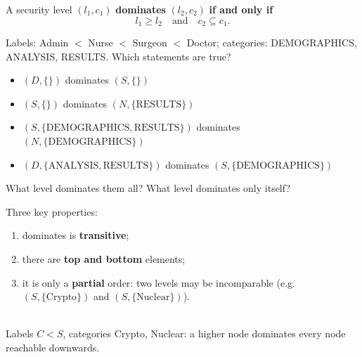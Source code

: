 \begin{defnbox}[title=Dominance relationship]
A security level $(l_1, c_1)$ \textbf{dominates} $(l_2, c_2)$ \textbf{if and only if}
\[
  l_1 \geq l_2 \quad\text{and}\quad c_2 \subseteq c_1 .
\]
\end{defnbox}

\begin{exbox}[title={Exercise --- Dominance}]
Labels: Admin $<$ Nurse $<$ Surgeon $<$ Doctor; categories: DEMOGRAPHICS, ANALYSIS,
RESULTS. Which statements are true?
\begin{itemize}
  \item $(D, \{\})$ dominates $(S, \{\})$
  \item $(S, \{\})$ dominates $(N, \{\text{RESULTS}\})$
  \item $(S, \{\text{DEMOGRAPHICS}, \text{RESULTS}\})$ dominates
        $(N, \{\text{DEMOGRAPHICS}\})$
  \item $(D, \{\text{ANALYSIS}, \text{RESULTS}\})$ dominates
        $(S, \{\text{DEMOGRAPHICS}\})$
\end{itemize}
What level dominates them all? What level dominates only itself?
\end{exbox}

\begin{propbox}[title=Dominance lattice]
Three key properties:
\begin{enumerate}[label=(\alph*)]
  \item dominates is \textbf{transitive};
  \item there are \textbf{top and bottom} elements;
  \item it is only a \textbf{partial} order: two levels may be incomparable (e.g.\
        $(S, \{\text{Crypto}\})$ and $(S, \{\text{Nuclear}\})$).
\end{enumerate}
\begin{center}
 \\
{\small Labels $C < S$, categories Crypto, Nuclear: a higher node dominates every node
reachable downwards.}
\end{center}
\end{propbox}

